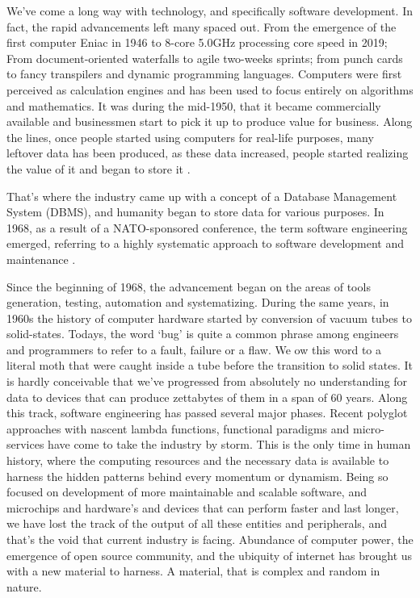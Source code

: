 We’ve come a long way with technology, and specifically software development. In fact, the rapid advancements left many spaced out. From the emergence of the first computer Eniac in 1946 to 8-core 5.0GHz processing core speed in 2019; From document-oriented waterfalls to agile two-weeks sprints; from punch cards to fancy transpilers  and dynamic programming languages.  Computers were first perceived as calculation engines and has been used to focus entirely on algorithms and mathematics. It was during the mid-1950, that it became commercially available and businessmen start to pick it up to produce value for business. Along the lines, once people started using computers for real-life purposes, many leftover data has been produced, as these data increased, people started realizing the value of it and began to store it \cite{Grad2009}.

That’s where the industry came up with a concept of a Database Management System (DBMS), and humanity began to store data for various purposes. In 1968, as a result of a NATO-sponsored conference, the term software engineering emerged, referring to a highly systematic approach to software development and maintenance \cite{Wirth2008}.

Since the beginning of 1968, the advancement began on the areas of tools generation, testing, automation and systematizing. During the same years, in 1960s the history of computer hardware started by conversion of vacuum tubes to solid-states. Todays, the word ‘bug’ is quite a common phrase among engineers and programmers to refer to a fault, failure or a flaw. We ow this word to a literal moth that were caught inside a tube before the transition to solid states. It is hardly conceivable that we’ve progressed from absolutely no understanding for data to devices that can produce zettabytes of them in a span of 60 years. Along this track, software engineering has passed several major phases. Recent polyglot approaches with nascent lambda functions, functional paradigms and micro-services have come to take the industry by storm. This is the only time in human history, where the computing resources and the necessary data is available to harness the hidden patterns behind every momentum or dynamism. Being so focused on development of more maintainable and scalable software, and microchips and hardware’s and devices that can perform faster and last longer, we have lost the track of the output of all these entities and peripherals, and that’s the void that current industry is facing. Abundance of computer power, the emergence of open source community, and the ubiquity of internet has brought us with a new material to harness. A material, that is complex and random in nature.


